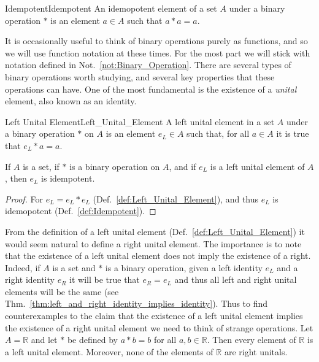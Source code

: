     \begin{fdefinition}{Idempotent}{Idempotent}
        An idemopotent element of a \gls{set} $A$ under a \gls{binary operation}
        $*$ is an element $a\in{A}$ such that $a*a=a$.
    \end{fdefinition}
    It is occasionally useful to think of binary operations purely as functions,
    and so we will use function notation at these times. For the most part we
    will stick with notation defined in Not.~\ref{not:Binary_Operation}. There
    are several types of binary operations worth studying, and several key
    properties that these operations can have. One of the most fundamental is
    the existence of a \textit{unital} element, also known as an identity.
    \begin{fdefinition}{Left Unital Element}{Left_Unital_Element}
        A left unital element in a \gls{set} $A$ under a \gls{binary operation}
        $*$ on $A$ is an element $e_{L}\in{A}$ such that, for all $a\in{A}$ it
        is true that $e_{L}*a=a$.
    \end{fdefinition}
    \begin{theorem}
        If $A$ is a set, if $*$ is a binary operation on $A$, and if $e_{L}$
        is a left unital element of $A$, then $e_{L}$ is idempotent.
    \end{theorem}
    \begin{proof}
        For $e_{L}=e_{L}*e_{L}$ (Def.~\ref{def:Left_Unital_Element}), and thus
        $e_{L}$ is idemopotent (Def.~\ref{def:Idempotent}).
    \end{proof}
    \begin{example}
        From the definition of a left unital element
        (Def.~\ref{def:Left_Unital_Element}) it would seem natural to define a
        right unital element. The importance is to note that the existence of a
        left unital element does not imply the existence of a right. Indeed, if
        $A$ is a set and $*$ is a binary operation, given a left identity
        $e_{L}$ and a right identity $e_{R}$ it will be true that $e_{R}=e_{L}$
        and thus all left and right unital elements will be the same
        (see Thm.~\ref{thm:left_and_right_identity_implies_identity}). Thus to
        find counterexamples to the claim that the existence of a left unital
        element implies the existence of a right unital element we need to think
        of strange operations. Let $A=\mathbb{R}$ and let $*$ be defined by
        $a*b=b$ for all $a,b\in\mathbb{R}$. Then every element of $\mathbb{R}$
        is a left unital element. Moreover, none of the elements of $\mathbb{R}$
        are right unitals.
    \end{example}
